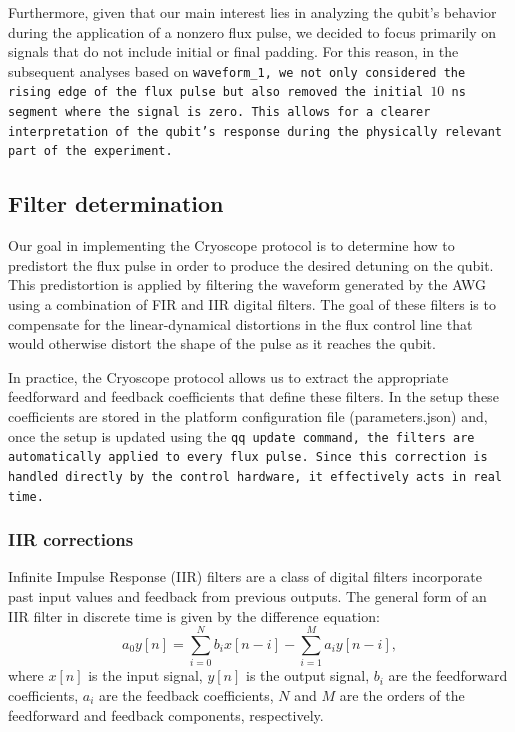 Furthermore, given that our main interest lies in analyzing the qubit's behavior during the application of a nonzero flux pulse, we decided to focus primarily on signals that do not include initial or final padding.
For this reason, in the subsequent analyses based on \tt{waveform\_1}, we not only considered the rising edge of the flux pulse but also removed the initial $10$ ns segment where the signal is zero. 
This allows for a clearer interpretation of the qubit's response during the physically relevant part of the experiment.

\subsection{Filter determination}
Our goal in implementing the Cryoscope protocol is to determine how to predistort the flux pulse in order to produce the desired detuning on the qubit. 
This predistortion is applied by filtering the waveform generated by the AWG using a combination of FIR and IIR digital filters. 
The goal of these filters is to compensate for the linear-dynamical distortions in the flux control line that would otherwise distort the shape of the pulse as it reaches the qubit.

In practice, the Cryoscope protocol allows us to extract the appropriate feedforward and feedback coefficients that define these filters. 
In the \Qibo setup these coefficients are stored in the platform configuration file (parameters.json) and, once the setup is updated using the \tt{qq update} command, the filters are automatically applied to every flux pulse. 
Since this correction is handled directly by the control hardware, it effectively acts in real time.

\subsubsection{IIR corrections}

Infinite Impulse Response (IIR) filters are a class of digital filters incorporate past input values and feedback from previous outputs.
The general form of an IIR filter in discrete time is given by the difference equation:
\begin{equation}
        a_0 y[n] = \sum_{i=0}^{N} b_i x[n - i] - \sum_{i=1}^{M} a_i y[n - i],
\end{equation}
where $x[n]$ is the input signal, $y[n]$ is the output signal, $b_i$ are the feedforward coefficients, $a_i$ are the feedback coefficients, $N$ and $M$ are the orders of the feedforward and feedback components, respectively.

